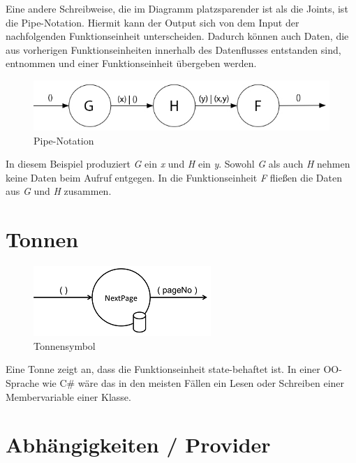 \bigskip
Eine andere Schreibweise, die im Diagramm platzsparender ist als die Joints, ist die Pipe-Notation.
Hiermit kann der Output sich von dem Input der nachfolgenden Funktionseinheit unterscheiden.
Dadurch können auch Daten, die aus vorherigen Funktionseinheiten innerhalb des Datenflusses entstanden sind, entnommen und einer Funktionseinheit
übergeben werden.

\begin{figure}[!htbp]
	\centering
	\includegraphics[width=\linewidth]{./img/diagramPipe.jpg}
	\caption{Pipe-Notation}
\end{figure}

In diesem Beispiel produziert \textit{G} ein \textit{x} und \textit{H} ein \textit{y}. Sowohl \textit{G} als auch \textit{H} nehmen keine Daten beim Aufruf entgegen.
In die Funktionseinheit \textit{F} fließen die Daten aus \textit{G} und \textit{H} zusammen.

\section{Tonnen}

\begin{figure}[!htbp]
	\centering
		\includegraphics[width=.7\linewidth]{./img/diagramTonne.png}
	\caption{Tonnensymbol}
\end{figure}



Eine Tonne zeigt an, dass die Funktionseinheit state-behaftet ist.
In einer OO-Sprache wie C\# wäre das in den meisten Fällen ein Lesen oder
Schreiben einer Membervariable einer Klasse.

\section{Abhängigkeiten / Provider}

